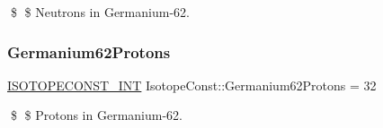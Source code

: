 \$ \$ Neutrons in Germanium-\/62. \mbox{\label{group___isotope_const-_germanium-_ge62_gaf15ce12cce7a09ebd0403f6449c98d54}} 
\subsubsection{\texorpdfstring{Germanium62\+Protons}{Germanium62Protons}}
{\footnotesize\ttfamily \mbox{\hyperlink{group___isotope_const-_macros_ga5f18360b3e99483a35c32d789e62621c}{I\+S\+O\+T\+O\+P\+E\+C\+O\+N\+S\+T\+\_\+\+I\+NT}} Isotope\+Const\+::\+Germanium62\+Protons = 32}

\$ \$ Protons in Germanium-\/62. 